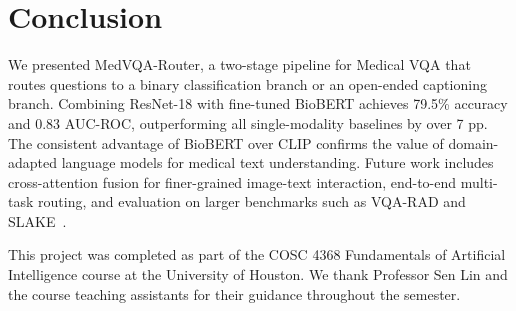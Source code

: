 \documentclass{article}
\begin{document}
\section{Conclusion}
\label{sec:conclusion}

We presented MedVQA-Router, a two-stage pipeline for Medical VQA that routes
questions to a binary classification branch or an open-ended captioning branch.
Combining ResNet-18 with fine-tuned BioBERT achieves 79.5\% accuracy and 0.83
AUC-ROC, outperforming all single-modality baselines by over 7 pp. The
consistent advantage of BioBERT over CLIP confirms the value of domain-adapted
language models for medical text understanding. Future work includes
cross-attention fusion for finer-grained image-text interaction, end-to-end
multi-task routing, and evaluation on larger benchmarks such as VQA-RAD and
SLAKE~\cite{liu2021slake}.


\begin{ack}
This project was completed as part of the COSC 4368 Fundamentals of Artificial
Intelligence course at the University of Houston. We thank Professor Sen Lin
and the course teaching assistants for their guidance throughout the semester.
\end{ack}






\appendix
\end{document}
